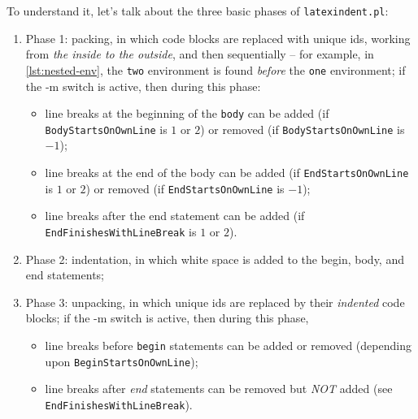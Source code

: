 \documentclass[10pt]{article}
\begin{document}
 To understand it, let's talk about the three basic phases \label{page:phases}of
 \texttt{latexindent.pl}:
 \begin{enumerate}
  \item Phase 1: packing, in which code blocks are replaced with unique ids, working from
        \emph{the inside to the outside}, and then sequentially -- for example, in
        \cref{lst:nested-env}, the \texttt{two} environment is found \emph{before} the
        \texttt{one} environment; if the -m switch is active, then during this phase:
        \begin{itemize}
         \item line breaks at the beginning of the \texttt{body} can be added (if
               \texttt{BodyStartsOnOwnLine} is $1$ or $2$) or removed (if
               \texttt{BodyStartsOnOwnLine} is $-1$);
         \item line breaks at the end of the body can be added (if
               \texttt{EndStartsOnOwnLine} is $1$ or $2$) or removed (if
               \texttt{EndStartsOnOwnLine} is $-1$);
         \item line breaks after the end statement can be added (if
               \texttt{EndFinishesWithLineBreak} is $1$ or $2$).
        \end{itemize}
  \item Phase 2: indentation, in which white space is added to the begin, body, and end
        statements;
  \item Phase 3: unpacking, in which unique ids are replaced by their \emph{indented}
        code blocks; if the -m switch is active, then during this phase,
        \begin{itemize}
         \item line breaks before \texttt{begin} statements can be added or removed
               (depending upon \texttt{BeginStartsOnOwnLine});
         \item line breaks after \emph{end} statements can be removed but \emph{NOT}
               added (see \texttt{EndFinishesWithLineBreak}).
        \end{itemize}
 \end{enumerate}
\end{document}

